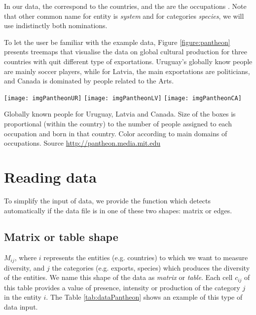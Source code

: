 In our data, the  correspond to the countries, and the  are the occupations .  Note that other common name for entity is \emph{system} and for categories \emph{species}, we will use indistinctly both nominations.

To let the user be familiar with the example data, Figure \ref{figure:pantheon} presents treemaps that visualise the data on global cultural production for three countries with quit different type of exportations. Uruguay's globally know people are mainly soccer players, while for Latvia, the main exportations are politicians, and Canada is dominated by people related to the Arts.

\begin{widefigure}[htbp]
  \centering
 \texttt{[image: imgPantheonUR]} 
 \texttt{[image: imgPantheonLV]} 
   \texttt{[image: imgPantheonCA]} 
  \caption{Globally known people for Uruguay, Latvia and Canada. Size of the boxes is proportional (within the country) to the number of people assigned to each occupation and born in that country. Color according to main domains of occupations. Source \url{http://pantheon.media.mit.edu}}
  \label{figure:pantheon}
\end{widefigure}



\section{Reading data}

To simplify the input of data, we provide the function  which detects automatically if the data file is in one of these two shapes: matrix or edges.


\subsection{Matrix or table shape}
 $M_{ij}$, where $i$ represents the entities (e.g. countries) to which we want to measure diversity, and $j$ the categories (e.g. exports, species) which produces the diversity of the entities. We name this shape of the data as \emph{matrix} or \emph{table}. Each cell $c_{ij}$ of this table provides a value of presence, intensity or production of the category $j$ in the entity $i$. The Table \ref{tab:dataPantheon} shows an example of this type of data input. 
  
